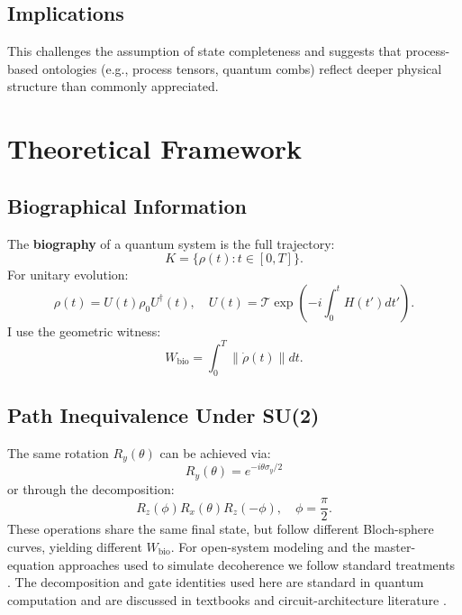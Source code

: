 \documentclass[11pt, onecolumn, letterpaper]{article}
\begin{document}
\subsection{Implications}
This challenges the assumption of state completeness and suggests that process-based ontologies (e.g., process tensors, quantum combs) reflect deeper physical structure than commonly appreciated.

\section{Theoretical Framework}

\subsection{Biographical Information}
The \textbf{biography} of a quantum system is the full trajectory:
\begin{equation}
K = \{\rho(t) : t \in [0, T]\}.
\end{equation}
For unitary evolution:
\begin{equation}
\rho(t) = U(t)\rho_0 U^\dagger(t), \quad U(t) = \mathcal{T}\exp\left(-i\int_0^t H(t')dt'\right).
\end{equation}
I use the geometric witness:
\begin{equation}
W_{\text{bio}} = \int_0^T \|\dot{\rho}(t)\| dt.
\end{equation}

\subsection{Path Inequivalence Under SU(2)}
The same rotation $R_y(\theta)$ can be achieved via:
\begin{equation}
R_y(\theta) = e^{-i\theta \sigma_y/2}
\end{equation}
or through the decomposition:
\begin{equation}
R_z(\phi) R_x(\theta) R_z(-\phi), \quad \phi = \frac{\pi}{2}.
\end{equation}
These operations share the same final state, but follow different Bloch-sphere curves, yielding different $W_{\text{bio}}$. For open-system modeling and the master-equation approaches used to simulate decoherence we follow standard treatments \cite{breuer2002open}.
The decomposition and gate identities used here are standard in quantum computation and are discussed in textbooks and circuit-architecture literature \cite{nielsen2010quantum, chiribella2008quantum}.
\end{document}
